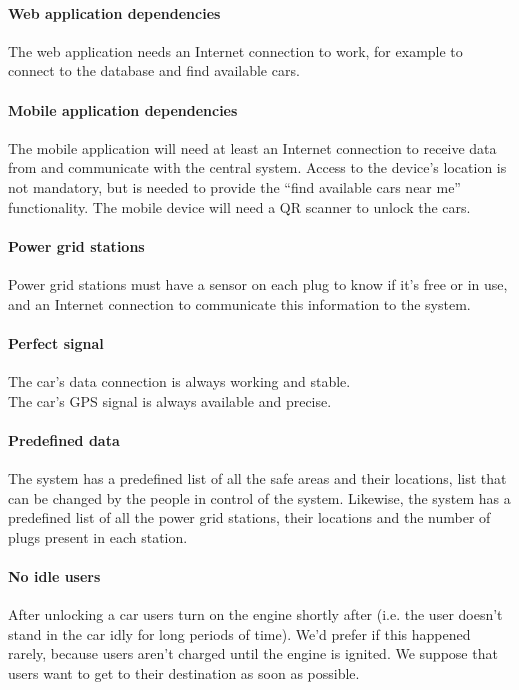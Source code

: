 \documentclass[english]{article}
\begin{document}
\paragraph{Web application dependencies}
The web application needs an Internet connection to work, for example to connect to the database and find available cars.

\paragraph{Mobile application dependencies}
The mobile application will need at least an Internet connection to receive data from and communicate with the central system. Access to the device’s location is not mandatory, but is needed to provide the “find available cars near me” functionality.
The mobile device will need a QR scanner to unlock the cars.

\paragraph{Power grid stations}
Power grid stations must have a sensor on each plug to know if it's free or in use, and an Internet connection to communicate this information to the system.





\paragraph{Perfect signal}
The car’s data connection is always working and stable. \\
The car’s GPS signal is always available and precise.

\paragraph{Predefined data}
The system has a predefined list of all the safe areas and their locations, list that can be changed by the people in control of the system. Likewise, the system has a predefined list of all the power grid stations, their locations and the number of plugs present in each station.

\paragraph{No idle users}
After unlocking a car users turn on the engine shortly after (i.e. the user doesn't stand in the car idly for long periods of time). We'd prefer if this happened rarely, because users aren't charged until the engine is ignited.
We suppose that users want to get to their destination as soon as possible.
\end{document}
